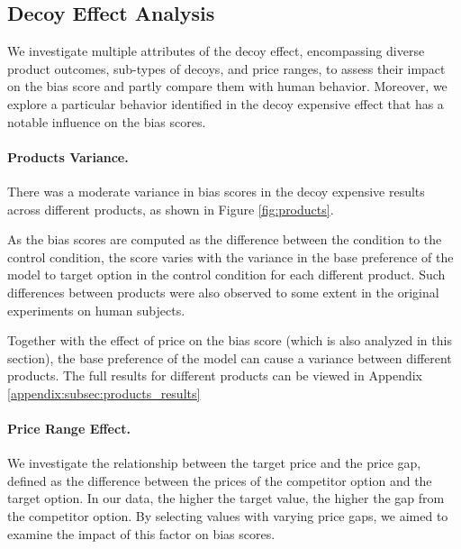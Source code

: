 \subsection{Decoy Effect Analysis}
\label{subsec:decoy_analysis}
We investigate multiple attributes of the decoy effect, encompassing diverse product outcomes, sub-types of decoys, and price ranges, to assess their impact on the bias score and partly compare them with human behavior.
Moreover, we explore a particular behavior identified in the decoy expensive effect that has a notable influence on the bias scores.

\paragraph{Products Variance.}
There was a moderate variance in bias scores in the decoy expensive results across different products, as shown in Figure \ref{fig:products}.

As the bias scores are computed as the difference between the \biaseddataset condition to the control condition, the score varies with the variance in the base preference of the model to target option in the control condition for each different product.
Such differences between products were also observed to some extent in the original experiments on human subjects.

Together with the effect of price on the bias score (which is also analyzed in this section), the base preference of the model can cause a variance between different products.
The full results for different products  can be viewed in Appendix \ref{appendix:subsec:products_results}







\paragraph{Price Range Effect.}

We investigate the relationship between the target price and the price gap, defined as the difference between the prices of the competitor option and the target option.
In our data, the higher the target value, the higher the gap from the competitor option.
By selecting values with varying price gaps, we aimed to examine the impact of this factor on bias scores.

